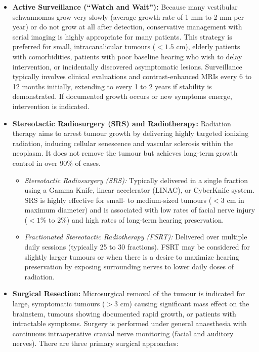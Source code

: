 \begin{itemize}
    \item \textbf{Active Surveillance (``Watch and Wait''):} Because many vestibular schwannomas grow very slowly (average growth rate of 1 mm to 2 mm per year) or do not grow at all after detection, conservative management with serial imaging is highly appropriate for many patients. This strategy is preferred for small, intracanalicular tumours ($< 1.5$ cm), elderly patients with comorbidities, patients with poor baseline hearing who wish to delay intervention, or incidentally discovered asymptomatic lesions. Surveillance typically involves clinical evaluations and contrast-enhanced MRIs every 6 to 12 months initially, extending to every 1 to 2 years if stability is demonstrated. If documented growth occurs or new symptoms emerge, intervention is indicated.
    \item \textbf{Stereotactic Radiosurgery (SRS) and Radiotherapy:} Radiation therapy aims to arrest tumour growth by delivering highly targeted ionizing radiation, inducing cellular senescence and vascular sclerosis within the neoplasm. It does not remove the tumour but achieves long-term growth control in over 90\% of cases.
    \begin{itemize}
        \item \textit{Stereotactic Radiosurgery (SRS):} Typically delivered in a single fraction using a Gamma Knife, linear accelerator (LINAC), or CyberKnife system. SRS is highly effective for small- to medium-sized tumours ($< 3$ cm in maximum diameter) and is associated with low rates of facial nerve injury ($< 1\%$ to 2\%) and high rates of long-term hearing preservation.
        \item \textit{Fractionated Stereotactic Radiotherapy (FSRT):} Delivered over multiple daily sessions (typically 25 to 30 fractions). FSRT may be considered for slightly larger tumours or when there is a desire to maximize hearing preservation by exposing surrounding nerves to lower daily doses of radiation.
    \end{itemize}
    \item \textbf{Surgical Resection:} Microsurgical removal of the tumour is indicated for large, symptomatic tumours ($> 3$ cm) causing significant mass effect on the brainstem, tumours showing documented rapid growth, or patients with intractable symptoms. Surgery is performed under general anaesthesia with continuous intraoperative cranial nerve monitoring (facial and auditory nerves). There are three primary surgical approaches:

\end{itemize}
